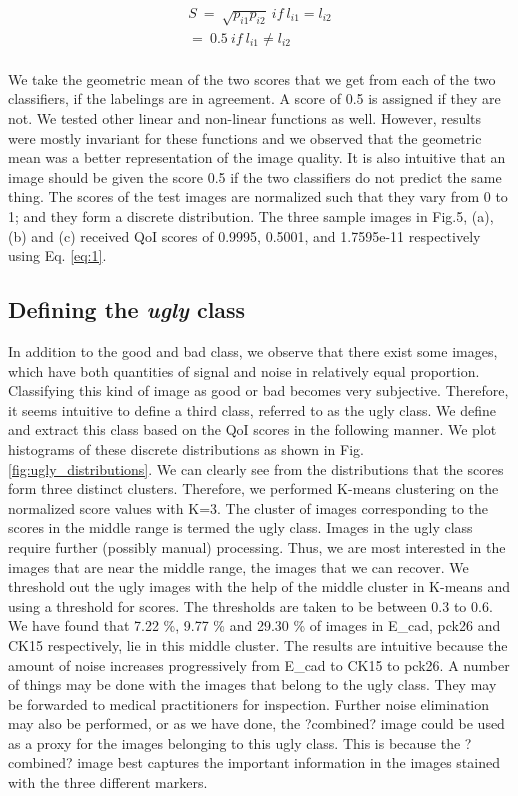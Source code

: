 \begin{equation}
\begin{gathered} 
S \ =  \ \sqrt{p_{i1}p_{i2}} \ if \  l_{i1} = l_{i2}\\ 
     = \ 0.5 \ if \  l_{i1}  \neq l_{i2}\\ 
\end{gathered}
\label{eq:1}
\end{equation}

We take the geometric mean of the two scores that we get from each of the two classifiers, if the labelings are in agreement. A score of 0.5 is assigned if they are not. We tested other linear and non-linear functions as well. However, results were mostly invariant for these functions and we observed that the geometric mean was a better representation of the image quality. It is also intuitive that an image should be given the score 0.5 if the two classifiers do not predict the same thing. 
The scores of the test images are normalized such that they vary from 0 to 1; and they form a discrete distribution. The three sample images in Fig.5, (a), (b) and (c) received QoI scores of 0.9995, 0.5001, and 1.7595e-11 respectively using Eq. \ref{eq:1}.


\subsection{Defining the \textit{ugly} class}
In addition to the good and bad class, we observe that there exist some images, which have both quantities of signal and noise in relatively equal proportion. Classifying this kind of image as good or bad becomes very subjective. Therefore, it seems intuitive to define a third class, referred to as the ugly class. We define and extract this class based on the QoI scores in the following manner.
We plot histograms of these discrete distributions as shown in Fig. \ref{fig:ugly_distributions}. We can clearly see from the distributions that the scores form three distinct clusters. Therefore, we performed K-means clustering on the normalized score values with K=3. The cluster of images corresponding to the scores in the middle range is termed the ugly class. Images in the ugly class require further (possibly manual) processing. Thus, we are most interested in the images that are near the middle range, the images that we can recover. 
We threshold out the ugly images with the help of the middle cluster in K-means and using a threshold for scores. The thresholds are taken to be between 0.3 to 0.6. We have found that 7.22 \%, 9.77 \% and 29.30 \% of images in E\_cad, pck26 and CK15 respectively, lie in this middle cluster. The results are intuitive because the amount of noise increases progressively from E\_cad to CK15 to pck26. A number of things may be done with the images that belong to the ugly class. They may be forwarded to medical practitioners for inspection. Further noise elimination may also be performed, or as we have done, the ?combined? image could be used as a proxy for the images belonging to this ugly class. This is because the ?combined? image best captures the important information in the images stained with the three different markers.

